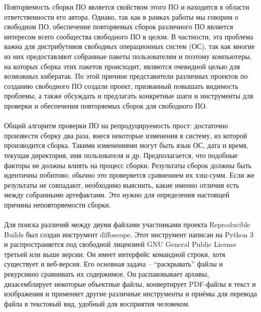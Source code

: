 Повторяемость сборки ПО является свойством этого ПО и находится в области ответственности его автора. Однако, так как в рамках работы мы говорим о свободном ПО, обеспечение повторяемых сборок различного ПО является интересом всего сообщества свободного ПО в целом. В частности, эта проблема важна для дистрибутивов свободных операционных систем (ОС), так как многие из них предоставляют собранные пакеты пользователям и поэтому компьютеры, на которых сборка этих пакетов происходит, являются очевидной целью для возможных кибератак. По этой причине представители различных проектов по созданию свободного ПО создали проект, призванный повышать видимость проблемы, а также обсуждать и предлагать конкретные шаги и инструменты для проверки и обеспечения повторяемых сборок для свободного ПО.\\\\
Общий алгоритм проверки ПО на репродуцируемость прост: достаточно произвести сборку два раза, внеся некоторые изменения в систему, из которой производится сборка. Такими изменениями могут быть язык ОС, дата и время, текущая директория, имя пользователя и др. Предполагается, что подобные факторы не должны влиять на процесс сборки. Результаты сборок должны быть идентичны побитово; обычно это проверяется сравнением их хэш-сумм. Если же результаты не совпадают, необходимо выяснить, какие именно отличия есть между собранными артефактами. Это нужно для определения настоящей причины неповторяемости сборки.\\\\
Для поиска различий между двумя файлами участниками проекта Reproducible Builds был создан инструмент diffoscope. Этот инструмент написан на Python 3 и распространяется под свободной лицензией GNU General Public License третьей или выше версии. Он имеет интерфейс командной строки, хотя существует и веб-версия. Его основная задача -- ``раскрывать'' файлы и рекурсивно сравнивать их содержимое. Он распаковывает архивы, дизасемблирует некоторые объектные файлы, конвертирует PDF-файлы в текст и изображения и применяет другие различные инструменты и приёмы для перевода файла в текстовый вид, удобный для восприятия человеком.
